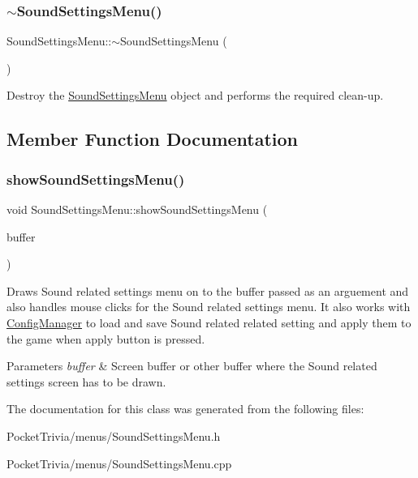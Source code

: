 \subsubsection{\texorpdfstring{$\sim$SoundSettingsMenu()}{~SoundSettingsMenu()}}
{\footnotesize\ttfamily Sound\+Settings\+Menu\+::$\sim$\+Sound\+Settings\+Menu (\begin{DoxyParamCaption}{ }\end{DoxyParamCaption})}



Destroy the \mbox{\hyperlink{class_sound_settings_menu}{Sound\+Settings\+Menu}} object and performs the required clean-\/up. 



\subsection{Member Function Documentation}
\mbox{\label{class_sound_settings_menu_a3ac0e1463e67b8165cfd4491a251e5fa}} 
\subsubsection{\texorpdfstring{showSoundSettingsMenu()}{showSoundSettingsMenu()}}
{\footnotesize\ttfamily void Sound\+Settings\+Menu\+::show\+Sound\+Settings\+Menu (\begin{DoxyParamCaption}\item[{B\+I\+T\+M\+AP $\ast$}]{buffer }\end{DoxyParamCaption})}



Draws Sound related settings menu on to the buffer passed as an arguement and also handles mouse clicks for the Sound related settings menu. It also works with \mbox{\hyperlink{class_config_manager}{Config\+Manager}} to load and save Sound related related setting and apply them to the game when apply button is pressed. 


\begin{DoxyParams}{Parameters}
{\em buffer} & Screen buffer or other buffer where the Sound related settings screen has to be drawn. \\
\hline
\end{DoxyParams}


The documentation for this class was generated from the following files\+:\begin{DoxyCompactItemize}
\item 
Pocket\+Trivia/menus/Sound\+Settings\+Menu.\+h\item 
Pocket\+Trivia/menus/Sound\+Settings\+Menu.\+cpp\end{DoxyCompactItemize}
